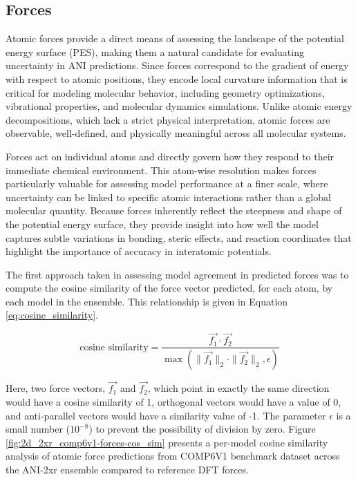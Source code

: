 \subsection{Forces}
\label{subsec:forces}

Atomic forces provide a direct means of assessing the landscape of the potential energy surface (PES), making them a natural candidate for evaluating uncertainty in ANI predictions. 
Since forces correspond to the gradient of energy with respect to atomic positions, they encode local curvature information that is critical for modeling molecular behavior, including geometry optimizations, vibrational properties, and molecular dynamics simulations. 
Unlike atomic energy decompositions, which lack a strict physical interpretation, atomic forces are observable, well-defined, and physically meaningful across all molecular systems.

Forces act on individual atoms and directly govern how they respond to their immediate chemical environment. This atom-wise resolution makes forces particularly valuable for assessing model performance at a finer scale, where uncertainty can be linked to specific atomic interactions rather than a global molecular quantity. 
Because forces inherently reflect the steepness and shape of the potential energy surface, they provide insight into how well the model captures subtle variations in bonding, steric effects, and reaction coordinates that highlight the importance of accuracy in interatomic potentials.

The first approach taken in assessing model agreement in predicted forces was to compute the cosine similarity of the force vector predicted, for each atom, by each model in the ensemble. This relationship is given in Equation \ref{eq:cosine_similarity}.

\begin{equation}
\text{cosine similarity} = \frac{\vec{f_1} \cdot \vec{f_2}}{\max(\|\vec{f_1}\|_2 \cdot \|\vec{f_2}\|_2, \epsilon)}
\label{eq:cosine_similarity}
\end{equation}

Here, two force vectors, $\vec{f_1}$ and $\vec{f_2}$, which point in exactly the same direction would have a cosine similarity of 1, orthogonal vectors would have a value of 0, and anti-parallel vectors would have a similarity value of -1.
The parameter $\epsilon$ is a small number ($10^{-8}$) to prevent the possibility of division by zero. 
Figure \ref{fig:2d_2xr_comp6v1-forces-cos_sim} presents a per-model cosine similarity analysis of atomic force predictions from COMP6V1 benchmark dataset across the ANI-2xr ensemble compared to reference DFT forces. 

